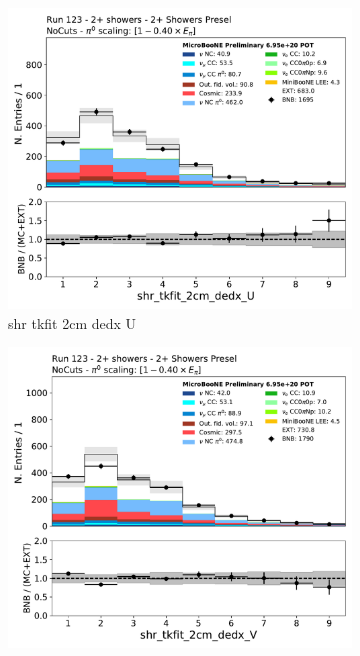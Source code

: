 \begin{figure}[H]
    \centering
    \begin{subfigure}{0.3\textwidth}
    \includegraphics[width=1.0\textwidth]{Sidebands/Figures/TwoShr_1e0pSel/Presel/shr_tkfit_2cm_dedx_U.pdf}
    \caption{shr tkfit 2cm dedx U}
    \end{subfigure}
    \begin{subfigure}{0.3\textwidth}
    \includegraphics[width=1.0\textwidth]{Sidebands/Figures/TwoShr_1e0pSel/Presel/shr_tkfit_2cm_dedx_V.pdf}

\end{subfigure}
\end{figure}
